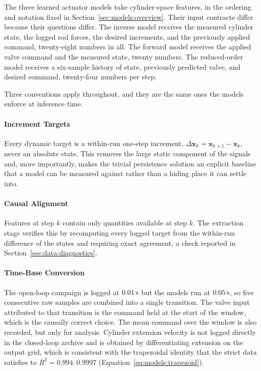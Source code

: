 The three learned actuator models take cylinder-space features, in the
ordering and notation fixed in Section~\ref{sec:models:overview}. Their
input contracts differ because their questions differ. The inverse model
receives the measured cylinder state, the logged rod forces, the desired
increments, and the previously applied command, twenty-eight numbers in
all. The forward model receives the applied valve command and the
measured state, twenty numbers. The reduced-order model receives a
six-sample history of state, previously predicted valve, and desired
command, twenty-four numbers per step.

Three conventions apply throughout, and they are the same ones the models
enforce at inference time.

\paragraph{Increment Targets}
Every dynamic target is a within-run one-step increment,
$\Delta \bm{x}_k = \bm{x}_{k+1} - \bm{x}_k$, never an absolute state.
This removes the large static component of the signals and, more
importantly, makes the trivial persistence solution an explicit baseline
that a model can be measured against rather than a hiding place it can
settle into.

\paragraph{Causal Alignment}
Features at step $k$ contain only quantities available at step $k$. The
extraction stage verifies this by recomputing every logged target from
the within-run difference of the states and requiring exact agreement,
a check reported in Section~\ref{sec:data:diagnostics}.

\paragraph{Time-Base Conversion}
The open-loop campaign is logged at $\unit[0.01]{s}$ but the models run
at $\unit[0.05]{s}$, so five consecutive raw samples are combined into a
single transition. The valve input attributed to that transition is the
command held at the start of the window, which is the causally correct
choice. The mean command over the window is also recorded, but only for
analysis. Cylinder extension velocity is not logged directly in the
closed-loop archive and is obtained by differentiating extension on the
output grid, which is consistent with the trapezoidal identity that the
strict data satisfies to $R^2 = 0.994$--$0.9997$
(Equation~\ref{eq:models:trapezoid}).

